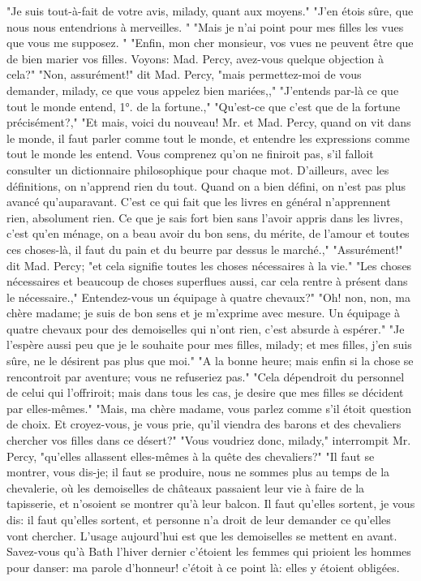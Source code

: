 "Je suis tout-à-fait de votre avis, milady, quant aux moyens."
"J’en étois sûre, que nous nous entendrions à merveilles. "
"Mais je n’ai point pour mes filles les vues que vous me supposez. "
"Enfin, mon cher monsieur, vos vues ne peuvent être que de bien marier vos filles. Voyons: Mad. Percy, avez-vous quelque objection à cela?"\setcounter{page}{388} "Non, assurément!" dit Mad. Percy,
"mais permettez-moi de vous demander, milady, ce que vous appelez bien mariées,,"
"J'entends par-là ce que tout le monde entend, 1°. de la fortune.,"
"Qu'est-ce que c'est que de la fortune précisément?,"
"Et mais, voici du nouveau! Mr. et Mad. Percy, quand on vit dans le monde, il faut parler comme tout le monde, et entendre les expressions comme tout le monde les entend. Vous comprenez qu'on ne finiroit pas, s'il falloit consulter un dictionnaire philosophique pour chaque mot. D'ailleurs, avec les définitions, on n'apprend rien du tout. Quand on a bien défini, on n'est pas plus avancé qu'auparavant. C'est ce qui fait que les livres en général n'apprennent rien, absolument rien. Ce que je sais fort bien sans l'avoir appris dans les livres, c'est qu'en ménage, on a beau avoir du bon sens, du mérite, de l'amour et toutes ces choses-là, il faut du pain et du beurre par dessus le marché.,"
"Assurément!" dit Mad. Percy; "et cela signifie toutes les choses nécessaires à la vie."
"Les choses nécessaires et beaucoup de choses superflues aussi, car cela rentre à présent dans le nécessaire.,"
\setcounter{page}{389} Entendez-vous un équipage à quatre chevaux?"
"Oh! non, non, ma chère madame; je suis de bon sens et je m'exprime avec mesure. Un équipage à quatre chevaux pour des demoiselles qui n'ont rien, c'est absurde à espérer."
"Je l'espère aussi peu que je le souhaite pour mes filles, milady; et mes filles, j'en suis sûre, ne le désirent pas plus que moi."
"A la bonne heure; mais enfin si la chose se rencontroit par aventure; vous ne refuseriez pas."
"Cela dépendroit du personnel de celui qui l'offriroit; mais dans tous les cas, je desire que mes filles se décident par elles-mêmes."
"Mais, ma chère madame, vous parlez comme s'il étoit question de choix. Et croyez-vous, je vous prie, qu'il viendra des barons et des chevaliers chercher vos filles dans ce désert?"
"Vous voudriez donc, milady," interrompit Mr. Percy, "qu'elles allassent elles-mêmes à la quête des chevaliers?"
"Il faut se montrer, vous dis-je; il faut se produire, nous ne sommes plus au temps de la chevalerie, où les demoiselles de châteaux\setcounter{page}{390} passaient leur vie à faire de la tapisserie, et n'osoient se montrer qu'à leur balcon. Il faut qu'elles sortent, je vous dis: il faut qu'elles sortent, et personne n'a droit de leur demander ce qu'elles vont chercher. L'usage aujourd'hui est que les demoiselles se mettent en avant. Savez-vous qu'à Bath l'hiver dernier c'étoient les femmes qui prioient les hommes pour danser: ma parole d'honneur! c'étoit à ce point là: elles y étoient obligées.
